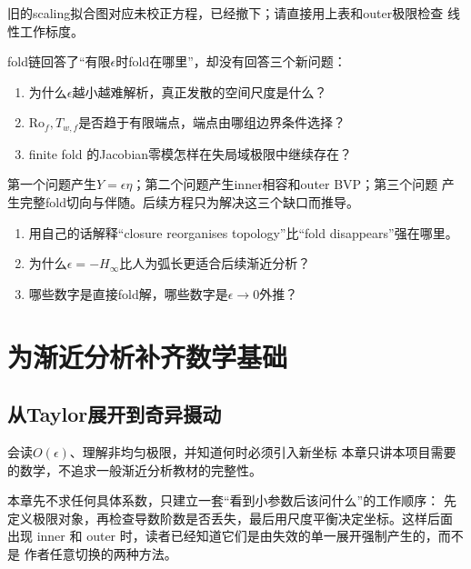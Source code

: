 \documentclass[UTF8,zihao=-4,openany]{ctexbook}
\newcommand{\eps}{\epsilon}
\newcommand{\Ro}{\mathrm{Ro}}
\begin{document}
旧的scaling拟合图对应未校正方程，已经撤下；请直接用上表和outer极限检查
线性工作标度。

\begin{keyresult}[：为什么下一章不再继续堆数值点]
fold链回答了“有限$\eps$时fold在哪里”，却没有回答三个新问题：
\begin{enumerate}
  \item 为什么$\eps$越小越难解析，真正发散的空间尺度是什么？
  \item $\Ro_f,T_{w,f}$是否趋于有限端点，端点由哪组边界条件选择？
  \item finite fold 的Jacobian零模怎样在失局域极限中继续存在？
\end{enumerate}
第一个问题产生$Y=\eps\eta$；第二个问题产生inner相容和outer BVP；第三个问题
产生完整fold切向与伴随。后续方程只为解决这三个缺口而推导。
\end{keyresult}

\enlargethispage{5\baselineskip}
\begin{checkpoint}
\begin{enumerate}
  \item 用自己的话解释“closure reorganises topology”比“fold disappears”强在哪里。
  \item 为什么$\eps=-H_\infty$比人为弧长更适合后续渐近分析？
  \item 哪些数字是直接fold解，哪些数字是$\eps\to0$外推？
\end{enumerate}
\end{checkpoint}

\part{为渐近分析补齐数学基础}

\chapter{从Taylor展开到奇异摄动}\label{ch:math}

\begin{learninggoal}{会读$O(\eps)$、理解非均匀极限，并知道何时必须引入新坐标}
本章只讲本项目需要的数学，不追求一般渐近分析教材的完整性。
\end{learninggoal}

本章先不求任何具体系数，只建立一套“看到小参数后该问什么”的工作顺序：
先定义极限对象，再检查导数阶数是否丢失，最后用尺度平衡决定坐标。这样后面
出现 inner 和 outer 时，读者已经知道它们是由失效的单一展开强制产生的，而不是
作者任意切换的两种方法。
\end{document}
